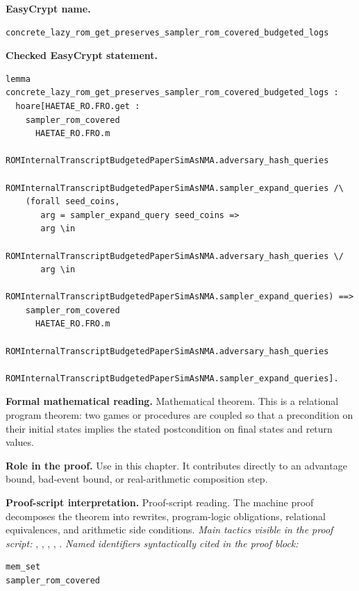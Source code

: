 \begin{formaltheorem}
\noindent\textbf{EasyCrypt name.}
\begin{lstlisting}[language=EasyCrypt,basicstyle=\ttfamily\scriptsize]
concrete_lazy_rom_get_preserves_sampler_rom_covered_budgeted_logs
\end{lstlisting}
\noindent\textbf{Checked EasyCrypt statement.}
\begin{lstlisting}[language=EasyCrypt,basicstyle=\ttfamily\scriptsize]
lemma concrete_lazy_rom_get_preserves_sampler_rom_covered_budgeted_logs :
  hoare[HAETAE_RO.FRO.get :
    sampler_rom_covered
      HAETAE_RO.FRO.m
      ROMInternalTranscriptBudgetedPaperSimAsNMA.adversary_hash_queries
      ROMInternalTranscriptBudgetedPaperSimAsNMA.sampler_expand_queries /\
    (forall seed_coins,
       arg = sampler_expand_query seed_coins =>
       arg \in
         ROMInternalTranscriptBudgetedPaperSimAsNMA.adversary_hash_queries \/
       arg \in
         ROMInternalTranscriptBudgetedPaperSimAsNMA.sampler_expand_queries) ==>
    sampler_rom_covered
      HAETAE_RO.FRO.m
      ROMInternalTranscriptBudgetedPaperSimAsNMA.adversary_hash_queries
      ROMInternalTranscriptBudgetedPaperSimAsNMA.sampler_expand_queries].
\end{lstlisting}
\noindent\textbf{Formal mathematical reading.}
Mathematical theorem. This is a relational program theorem: two games or procedures are coupled so that a precondition on their initial states implies the stated postcondition on final states and return values.

\noindent\textbf{Role in the proof.}
Use in this chapter. It contributes directly to an advantage bound, bad-event bound, or real-arithmetic composition step.

\noindent\textbf{Proof-script interpretation.}
Proof-script reading. The machine proof decomposes the theorem into rewrites, program-logic obligations, relational equivalences, and arithmetic side conditions.
\emph{Main tactics visible in the proof script:} \ec{proc}, \ec{wp}, \ec{rnd}, \ec{rewrite}, \ec{smt}.
\emph{Named identifiers syntactically cited in the proof block:}
\begin{lstlisting}[language=EasyCrypt,basicstyle=\ttfamily\scriptsize]
mem_set
sampler_rom_covered
\end{lstlisting}

\end{formaltheorem}

